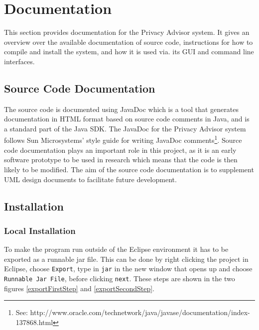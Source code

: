  

\chapter{Documentation}\label{doc}

\minitoc

This section provides documentation for the Privacy Advisor system. It gives an overview over the available documentation of source code, instructions for how to compile and install the system, and how it is used via. its GUI and command line interfaces.

\section{Source Code Documentation} 

The source code is documented using JavaDoc which is 	a tool that generates documentation in HTML format based on source code comments in Java, and is a standard part of the Java SDK. The JavaDoc for the Privacy Advisor system follows Sun Microsystems' style guide for writing JavaDoc comments\footnote{See: http://www.oracle.com/technetwork/java/javase/documentation/index-137868.html}. Source code documentation plays an important role in this project, as it is an early software prototype to be used in research which means that the code is then likely to be modified. The aim of the source code documentation is to supplement UML design documents to facilitate future development.

\section{Installation}

\subsection{Local Installation} \label{LocalInst}
To make the program run outside of the Eclipse environment it has to be exported as a runnable jar file. This can be done by right clicking the project in Eclipse, choose \texttt{Export}, type in \texttt{jar} in the new window that opens up and choose \texttt{Runnable Jar File}, before clicking \texttt{next}. These steps are shown in the two figures \ref{exportFirstStep} and \ref{exportSecondStep}.


